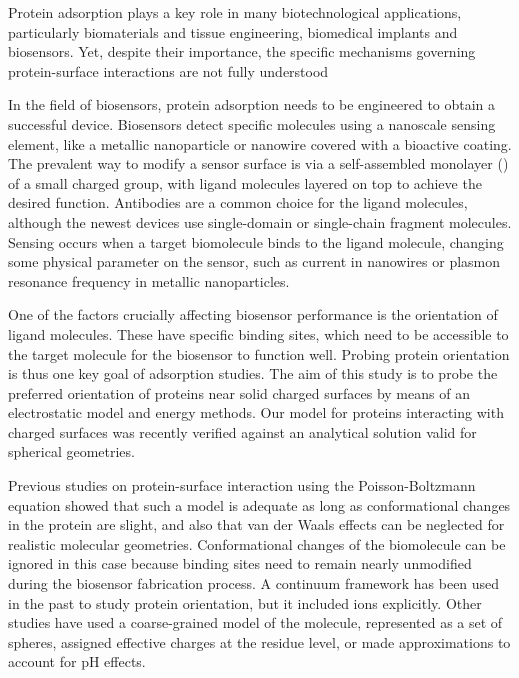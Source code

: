 
Protein adsorption plays a key role in many biotechnological applications, particularly biomaterials and tissue engineering, biomedical implants and biosensors.
Yet, despite their importance, the specific mechanisms governing protein-surface interactions are not fully understood\cite{Gray2004,RabeVerdesSeegel2011}

In the field of biosensors, protein adsorption needs to be engineered to obtain a successful device. 
Biosensors detect specific molecules using a nanoscale sensing element, like a metallic nanoparticle or nanowire covered with a bioactive coating. 
The prevalent way to modify a sensor surface is via a self-assembled monolayer (\sam) of a small charged group, with ligand molecules layered on top to achieve the desired function. 
Antibodies are a common choice for the ligand molecules, although the newest devices use single-domain or single-chain fragment molecules.\cite{ByunETal2013,TrillingETal2014} 
Sensing occurs when a target biomolecule binds to the ligand molecule,  changing some physical parameter on the sensor, such as current in nanowires or plasmon resonance frequency in metallic nanoparticles. 

One of the factors crucially affecting biosensor performance is the orientation of ligand molecules.\cite{TajimaTakaiIshihara2011,TrillingBeekwilderZuilhof2013} 
These have specific binding sites, which need to be accessible to the target molecule for the biosensor to function well.
Probing protein orientation is thus one key goal of adsorption studies.
The aim of this study is to probe the preferred orientation of proteins near solid charged surfaces by means of an electrostatic model and energy methods. Our model for proteins interacting with charged surfaces was recently verified against an analytical solution valid for spherical geometries.\cite{CooperBarba2015a}

Previous studies on protein-surface interaction using the Poisson-Boltzmann equation showed that such a model is adequate as long as conformational changes in the protein are slight,\cite{YaoLenhoff2004,YaoLenhoff2005} and also that van der Waals effects can be neglected for realistic molecular geometries.\cite{RothNealLenhoff1996}
Conformational changes of the biomolecule can be ignored in this case because binding sites need to remain nearly unmodified during the biosensor fabrication process.\cite{TajimaTakaiIshihara2011} 
A continuum framework has been used in the past to study protein orientation,\cite{JufferArgosDevlieg1996} but it included ions explicitly. Other studies have used a coarse-grained model of the molecule, represented as  a set of spheres,\cite{ShengTsaoZhouJiang2002,ZhouTsaoShengJiang2004} assigned effective charges at the residue level,\cite{FreedCramer2011,ZhouChenJiang2003} or made approximations to account for pH effects.\cite{BiesheuvelvanderVeenNord2005,HartvigdeWeertOstergaartJorgensenJensen2011}

